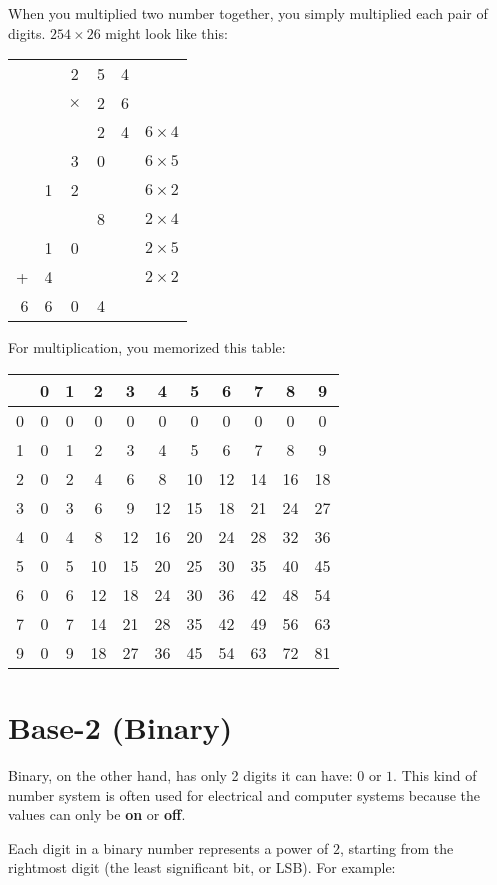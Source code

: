 When you multiplied two number together, you simply multiplied each
pair of digits. $254 \times 26$ might look like this:

\begin{tabular} {r c c c c | c}
 & & 2 & 5 & 4 & \\
 & & $\times$ & 2 & 6 & \\
 \hline
& &  & 2 & 4 & $6 \times 4$\\
& & 3 & 0 & & $6 \times 5$ \\
& 1 & 2 & & & $6 \times 2$ \\
& & & 8 & & $2 \times 4$ \\
& 1 & 0 & & & $2 \times 5$\\
+ & 4 & & & & $2 \times 2$\\
 \hline
 6 & 6 & 0 & 4
 \end{tabular}
 

For multiplication, you memorized this table:

\begin{tabular}{ c || c | c | c | c | c | c| c| c| c| c}
 & 0 & 1 & 2 & 3 & 4 & 5 & 6 & 7 & 8 & 9 \\
 \hline
 0 & 0 & 0 & 0 & 0 & 0 & 0 & 0 & 0 & 0 & 0 \\
 1 & 0 & 1 & 2 & 3 & 4 & 5 & 6 & 7 & 8 & 9 \\
 2 & 0 & 2 & 4 & 6 & 8 & 10 & 12 & 14 & 16 & 18 \\
 3 & 0 & 3 & 6 & 9 & 12 & 15 & 18 & 21 & 24 & 27 \\
 4 & 0 & 4 & 8 & 12 & 16 & 20 & 24 & 28 & 32 & 36 \\
 5 & 0 & 5 & 10 & 15 & 20 & 25 & 30 & 35 & 40 & 45 \\
 6 & 0 & 6 & 12 & 18 & 24 & 30 & 36 & 42 & 48 & 54 \\
 7 & 0 & 7 & 14 & 21 & 28 & 35 & 42 & 49 & 56 & 63 \\
 9 & 0 & 9 & 18 & 27 & 36 & 45 & 54 & 63 & 72 & 81 
 \end{tabular}

\section{Base-2 (Binary)}
Binary, on the other hand, has only 2 digits it can have: $0$ or $1$. 
This kind of number system is often used for electrical and computer systems because the values can only be \textbf{on} or \textbf{off}.

Each digit in a binary number represents a power of $2$, starting from the rightmost digit (the least significant bit, or LSB). For example:

